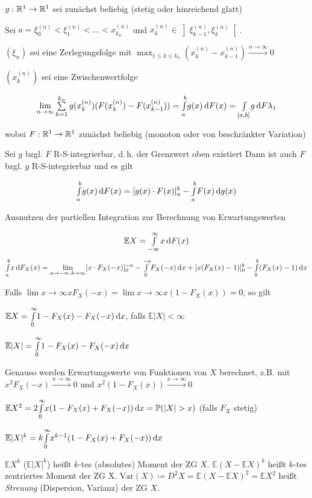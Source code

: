 \documentclass{cheat-sheet}
\renewcommand{\P}{\mathbb{P}} %
\newcommand{\E}{\mathbb{E}} %
\begin{document}
$g : \mathbb{R}^1 \to \mathbb{R}^1$ sei zunächst beliebig (stetig oder hinreichend glatt)

Sei $a = \xi_0^{(n)} < \xi_1^{(n)} < ... < x_{k_n}^{(n)}$ und $x_k^{(n)} \in \left] \xi_{k-1}^{(n)}, \xi_{k}^{(n)} \right[$.

\begin{defn}
  $(\xi_n)$ sei eine Zerlegungsfolge mit $\max_{1 \leq k \leq k_n} (x_k^{(n)} - x_{k-1}^{(n)}) \xrightarrow{n \to \infty} 0$

  $(x_k^{(n)})$ sei eine Zwischenwertfolge

  \[ \lim_{n \to \infty} \sum_{k=1}^{k_n} g(x_k^{(n)}) (F(x_k^{(n)}) - F(x_{k-1}^{(n)})) = \Int{a}{b}{g(x)}{F(x)} = \Int{[a, b]}{}{g}{F\lambda_1} \]

  wobei $F : \mathbb{R}^1 \to \mathbb{R}^1$ zunächst beliebig (monoton oder von beschränkter Variation)
\end{defn}


Sei $g$ bzgl. $F$ R-S-integrierbar, d.\,h. der Grenzwert oben existiert
Dann ist auch $F$ bzgl. $g$ R-S-integrierbar und es gilt

\[ {\textstyle \int\limits_{a}^{b}} g(x) \,\mathrm{d} F(x) = [g(x) \cdot F(x)]_a^b - {\textstyle \int\limits_{a}^{b}} F(x) \,\mathrm{d} g(x) \]

Ausnutzen der partiellen Integration zur Berechnung von Erwartungswerten

\[ \E X = \Int{- \infty}{\infty}{x}{F(x)} \]
\[ {\textstyle \int\limits_{a}^{b}} x \,\mathrm{d} F_X(x) = \lim_{a \to -\infty, b \to \infty} [x \cdot F_X(-x)]_0^{-a} - {\textstyle \int\limits_{0}^{-a}} F_X(-x) \,\mathrm{d} x + [x (F_X(x) - 1)]_0^b - {\textstyle \int\limits_{0}^{b}} (F_X(x) - 1) \,\mathrm{d} x \]

Falls $\lim{x \to \infty} x F_X(-x) = \lim{x \to \infty} x (1 - F_X(x)) = 0$, so gilt

$\E X = \Int{0}{\infty}{1 - F_X(x) - F_X(-x)}{x}$, falls $\E |X| < \infty$

$\E |X| = \Int{0}{\infty}{1 - F_X(x) - F_X(-x)}{x}$

Genauso werden Erwartungswerte von Funktionen von $X$ berechnet, z.B. mit $x^2 F_X(-x) \xrightarrow{x \to \infty} 0$ und $x^2 (1 - F_X(x)) \xrightarrow{x \to \infty} 0$

$\E X^2 = 2 \Int{0}{\infty}{x (1 - F_X(x) + F_X(-x))}{x} = \P(|X| > x)$ (falls $F_X$ stetig)

$\E |X|^k = k \Int{0}{\infty}{x^{k-1} (1 - F_X(x) + F_X(-x))}{x}$

\begin{defn}
  $\E X^k$ ($\E |X|^k$) heißt $k$-tes (absolutes) Moment der ZG $X$. $\E (X - \E X)^k$ heißt $k$-tes zentriertes Moment der ZG X. $\mathrm{Var}(X) \coloneqq D^2 X = \E (X - \E X)^2 = \E X^2$ heißt \emph{Streuung} (Dispersion, Varianz) der ZG $X$.
\end{defn}
\end{document}
